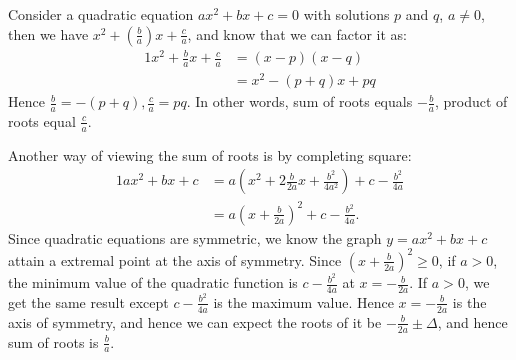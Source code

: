 
\begin{mysubsection}{}
    Consider a quadratic equation $ax^2+bx+c=0$ with solutions $p$ and $q$, $a\neq 0$, then we have $x^2+\left(\frac{b}{a}\right)x+\frac{c}{a}$, and know that we can factor it as:
    \begin{alignat*}{1}
        x^2+\frac{b}{a}x+\frac{c}{a}&=(x-p)(x-q) \\
                                    &= x^2-(p+q)x+pq
    \end{alignat*}
    Hence $\frac{b}{a}=-(p+q), \frac{c}{a}=pq$. In other words, sum of roots equals $-\frac{b}{a}$, product of roots equal $\frac{c}{a}$.

    Another way of viewing the sum of roots is by completing square:
    \begin{alignat*}{1}
        ax^2+bx+c&= a\left(x^2+2\frac{b}{2a}x+\frac{b^2}{4a^2}\right)+c-\frac{b^2}{4a}\\
                  &= a\left(x+\frac{b}{2a}\right)^2+c-\frac{b^2}{4a}.
    \end{alignat*}
    Since quadratic equations are symmetric, we know the graph $y=ax^2+bx+c$ attain a extremal point at the axis of symmetry. Since $\left(x+\frac{b}{2a}\right)^2\geq 0$, if $a>0$, the minimum value of the quadratic function is $c-\frac{b^2}{4a}$ at $x=-\frac{b}{2a}$. If $a>0$, we get the same result except $c-\frac{b^2}{4a}$ is the maximum value. Hence $x=-\frac{b}{2a}$ is the axis of symmetry, and hence we can expect the roots of it be $-\frac{b}{2a}\pm \Delta $, and hence sum of roots is $\frac{b}{a}$.
\end{mysubsection}

